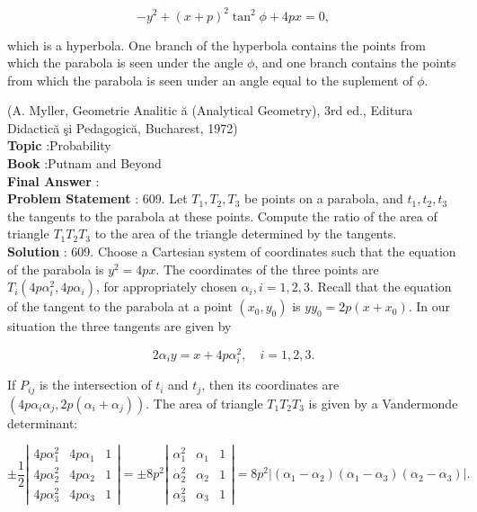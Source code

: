 \documentclass[10pt]{article}
\begin{document}
$$
-y^{2}+(x+p)^{2} \tan ^{2} \phi+4 p x=0,
$$

which is a hyperbola. One branch of the hyperbola contains the points from which the parabola is seen under the angle $\phi$, and one branch contains the points from which the parabola is seen under an angle equal to the suplement of $\phi$.

(A. Myller, Geometrie Analitic ă (Analytical Geometry), 3rd ed., Editura Didactică şi Pedagogică, Bucharest, 1972)
\\
\textbf{Topic} :Probability\\
\textbf{Book} :Putnam and Beyond\\
\textbf{Final Answer} :\\


\textbf{Problem Statement} :
609. Let $T_{1}, T_{2}, T_{3}$ be points on a parabola, and $t_{1}, t_{2}, t_{3}$ the tangents to the parabola at these points. Compute the ratio of the area of triangle $T_{1} T_{2} T_{3}$ to the area of the triangle determined by the tangents.
\\
\textbf{Solution} :
609. Choose a Cartesian system of coordinates such that the equation of the parabola is $y^{2}=4 p x$. The coordinates of the three points are $T_{i}\left(4 p \alpha_{i}^{2}, 4 p \alpha_{i}\right)$, for appropriately chosen $\alpha_{i}, i=1,2,3$. Recall that the equation of the tangent to the parabola at a point $\left(x_{0}, y_{0}\right)$ is $y y_{0}=2 p\left(x+x_{0}\right)$. In our situation the three tangents are given by

$$
2 \alpha_{i} y=x+4 p \alpha_{i}^{2}, \quad i=1,2,3 .
$$

If $P_{i j}$ is the intersection of $t_{i}$ and $t_{j}$, then its coordinates are $\left(4 p \alpha_{i} \alpha_{j}, 2 p\left(\alpha_{i}+\alpha_{j}\right)\right)$. The area of triangle $T_{1} T_{2} T_{3}$ is given by a Vandermonde determinant: 

$$
\pm \frac{1}{2}\left|\begin{array}{lll}
4 p \alpha_{1}^{2} & 4 p \alpha_{1} & 1 \\
4 p \alpha_{2}^{2} & 4 p \alpha_{2} & 1 \\
4 p \alpha_{3}^{2} & 4 p \alpha_{3} & 1
\end{array}\right|=\pm 8 p^{2}\left|\begin{array}{lll}
\alpha_{1}^{2} & \alpha_{1} & 1 \\
\alpha_{2}^{2} & \alpha_{2} & 1 \\
\alpha_{3}^{2} & \alpha_{3} & 1
\end{array}\right|=8 p^{2}\left|\left(\alpha_{1}-\alpha_{2}\right)\left(\alpha_{1}-\alpha_{3}\right)\left(\alpha_{2}-\alpha_{3}\right)\right| .
$$
\end{document}
